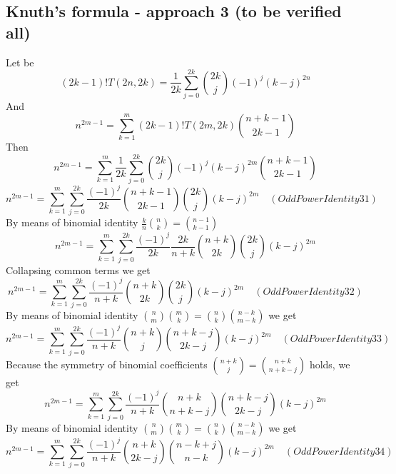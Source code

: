 \subsection{Knuth's formula - approach 3 (to be verified all)}\label{subsec:knuth's-formula---approach-3-(to-be-verified-all)}
Let be
\begin{equation*}
(2k-1)
    !T(2n, 2k) = \frac{1}{2k} \sum_{j=0}^{2k} \binom{2k}{j} (-1)^{j} (k-j)^{2n}
\end{equation*}
And
\begin{equation*}
    n^{2m-1} = \sum_{k=1}^{m} (2k-1)! T(2m,2k) \binom{n+k-1}{2k-1}
\end{equation*}
Then
\begin{equation*}
    n^{2m-1} = \sum_{k=1}^{m} \frac{1}{2k} \sum_{j=0}^{2k} \binom{2k}{j} (-1)^{j} (k-j)^{2m} \binom{n+k-1}{2k-1}
\end{equation*}
\begin{equation*}
    n^{2m-1} = \sum_{k=1}^{m} \sum_{j=0}^{2k} \frac{(-1)^{j}}{2k} \binom{n+k-1}{2k-1} \binom{2k}{j} (k-j)^{2m} \quad
    (OddPowerIdentity31)
\end{equation*}
By means of binomial identity $\frac{k}{n} \binom{n}{k} = \binom{n-1}{k-1}$
\begin{equation*}
    n^{2m-1} = \sum_{k=1}^{m} \sum_{j=0}^{2k} \frac{(-1)^{j}}{2k} \frac{2k}{n+k} \binom{n+k}{2k} \binom{2k}{j} (k-j)^{2m}
\end{equation*}
Collapsing common terms we get
\begin{equation*}
    n^{2m-1} = \sum_{k=1}^{m} \sum_{j=0}^{2k} \frac{(-1)^{j}}{n+k} \binom{n+k}{2k} \binom{2k}{j} (k-j)^{2m} \quad
    (OddPowerIdentity32)
\end{equation*}
By means of binomial identity $\binom{n}{m} \binom{m}{k} = \binom{n}{k} \binom{n-k}{m-k}$ we get
\begin{equation*}
    n^{2m-1} = \sum_{k=1}^{m} \sum_{j=0}^{2k} \frac{(-1)^{j}}{n+k} \binom{n+k}{j} \binom{n+k-j}{2k-j} (k-j)^{2m} \quad
    (OddPowerIdentity33)
\end{equation*}
Because the symmetry of binomial coefficients $\binom{n+k}{j} = \binom{n+k}{n+k-j}$ holds, we get
\begin{equation*}
    n^{2m-1} = \sum_{k=1}^{m} \sum_{j=0}^{2k} \frac{(-1)^{j}}{n+k} \binom{n+k}{n+k-j} \binom{n+k-j}{2k-j} (k-j)^{2m}
\end{equation*}
By means of binomial identity $\binom{n}{m} \binom{m}{k} = \binom{n}{k} \binom{n-k}{m-k}$ we get
\begin{equation*}
    n^{2m-1} = \sum_{k=1}^{m} \sum_{j=0}^{2k} \frac{(-1)^{j}}{n+k} \binom{n+k}{2k-j} \binom{n-k+j}{n-k} (k-j)^{2m} \quad
    (OddPowerIdentity34)
\end{equation*}